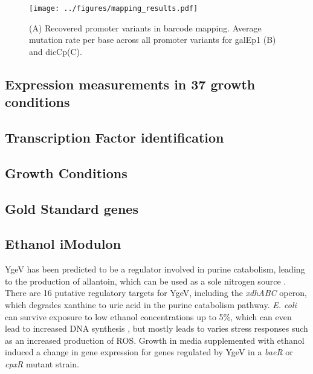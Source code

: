 \begin{figure}
    \centering
    \texttt{[image: ../figures/mapping\_results.pdf]}
    \caption{(A) Recovered promoter variants in barcode mapping. Average mutation rate per base across all promoter variants for galEp1 (B) and dicCp(C). }
    \label{fig:mapping_results}
\end{figure}

\subsection{Expression measurements in 37 growth conditions}




\subsection{Transcription Factor identification}
\subsection{Growth Conditions}
\subsection{Gold Standard genes}
\subsection{Ethanol iModulon}
YgeV has been predicted to be a regulator involved in purine catabolism, leading to the production of allantoin, which can be used as a sole nitrogen source \cite{iwadate2019identification}. There are 16 putative regulatory targets \cite{lamoureux2021precise} for YgeV, including the \textit{xdhABC} operon, which degrades xanthine to uric acid \cite{iwadate2019identification} in the purine catabolism pathway. \textit{E. coli} can survive exposure to low ethanol concentrations up to 5\%, which can even lead to increased DNA synthesis \cite{basu1994effect}, but mostly leads to varies stress responses such as an increased production of ROS. Growth in media supplemented with ethanol induced a change in gene expression for genes regulated by YgeV in a \textDelta\textit{baeR} or \textDelta\textit{cpxR} mutant strain. 
